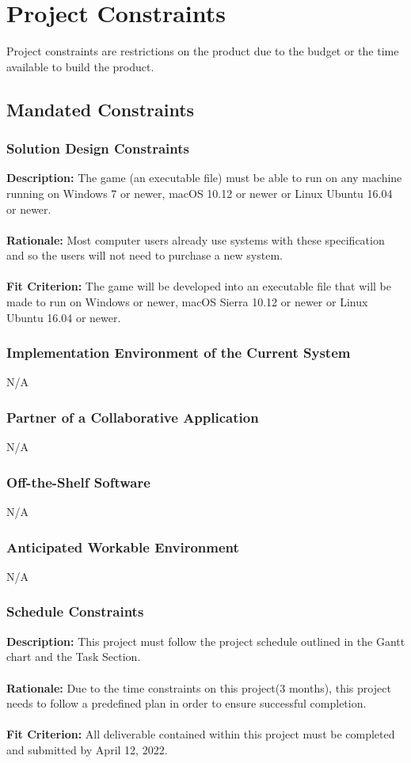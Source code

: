 \documentclass[12pt]{article}
\begin{document}
\section{Project Constraints}
Project constraints are restrictions on the product due to the budget or the 
time available to build the product.
\subsection{Mandated Constraints}
\subsubsection{Solution Design Constraints}
\textbf{Description:} The game (an executable file) must be able to run on any machine running on Windows 7 or newer, macOS 10.12 or newer or Linux Ubuntu  16.04 or newer.
\\ \\
\textbf{Rationale:} Most computer users already use systems with these specification and so the users will not need to purchase a new system. \\ \\
\textbf{Fit Criterion:} The game will be developed into an executable file that will be made to run on Windows or newer, macOS Sierra 10.12 or newer or Linux Ubuntu 16.04 or newer.
\subsubsection{Implementation Environment of the Current System}
N/A
\subsubsection{Partner of a Collaborative Application}
N/A
\subsubsection{Off-the-Shelf Software}
N/A
\subsubsection{Anticipated Workable Environment}
N/A
\subsubsection{Schedule Constraints}
\textbf{Description:} This project must follow the project schedule outlined in the Gantt chart and the Task Section. \\ \\ 
\textbf{Rationale:} Due to the time constraints on this project(3 months), this project needs to follow
a predefined plan in order to ensure successful completion. \\ \\ 
\textbf{Fit Criterion:} All deliverable contained within this project must be completed and submitted by April 12, 2022. 
\end{document}
